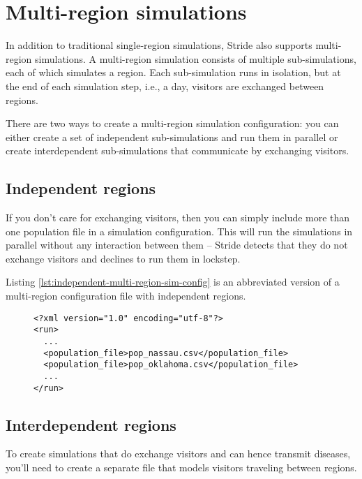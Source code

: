 \chapter{Multi-region simulations}

In addition to traditional single-region simulations, Stride also supports multi-region simulations. A multi-region simulation consists of multiple sub-simulations, each of which simulates a region. Each sub-simulation runs in isolation, but at the end of each simulation step, i.e., a day, visitors are exchanged between regions.

There are two ways to create a multi-region simulation configuration: you can either create a set of independent sub-simulations and run them in parallel or create interdependent sub-simulations that communicate by exchanging visitors.

\section{Independent regions}

If you don't care for exchanging visitors, then you can simply include more than one population file in a simulation configuration. This will run the simulations in parallel without any interaction between them -- Stride detects that they do not exchange visitors and declines to run them in lockstep.

Listing \ref{lst:independent-multi-region-sim-config} is an abbreviated version of a multi-region configuration file with independent regions.

\begin{figure}[h]
	\begin{lstlisting}
<?xml version="1.0" encoding="utf-8"?>
<run>
  ...
  <population_file>pop_nassau.csv</population_file>
  <population_file>pop_oklahoma.csv</population_file>
  ...
</run>
	\end{lstlisting}
\end{figure}


\section{Interdependent regions}

To create simulations that do exchange visitors and can hence transmit diseases, you'll need to create a separate file that models visitors traveling between regions.

